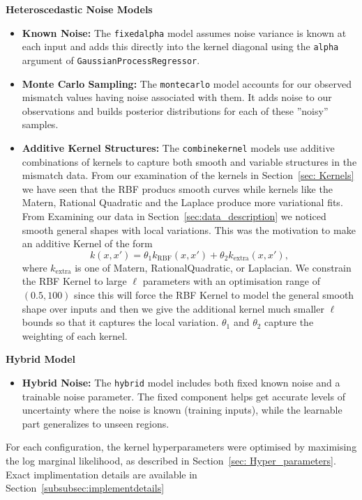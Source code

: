 \documentclass[10pt]{article}
\begin{document}
\noindent
\textbf{Heteroscedastic Noise Models}
\begin{itemize}
    \item \textbf{Known Noise:} The \texttt{fixedalpha} model assumes noise variance is known at each input and adds this directly into the kernel diagonal using the \texttt{alpha} argument of \texttt{GaussianProcessRegressor}.
    \item \textbf{Monte Carlo Sampling:} The \texttt{montecarlo} model accounts for our observed mismatch values having noise associated with them. It adds noise to our observations and builds posterior distributions for each of these ''noisy'' samples. 
    \item \textbf{Additive Kernel Structures:} The \texttt{combinekernel} models use additive combinations of kernels to capture both smooth and variable structures in the mismatch data. From our examination of the kernels in Section~\ref{sec: Kernels} we have seen that the RBF producs smooth curves while kernels like the Matern, Rational Quadratic and the Laplace produce more variational fits.
            From Examining our data in Section~\ref{sec:data_description} we noticed smooth general shapes with local variations. This was the motivation to make an additive Kernel of the form 
    \begin{equation}
        k(x, x') = \theta_1k_{\mathrm{RBF}}(x, x') + \theta_2k_{\mathrm{extra}}(x, x'),
    \end{equation}
    where \(k_{\mathrm{extra}}\) is one of Matern, RationalQuadratic, or Laplacian. We constrain the RBF Kernel to large \(\ell\) parameters with an optimisation range of \((0.5,100)\) since this will force the RBF Kernel to model the general smooth shape over inputs
    and then we give the additional kernel much smaller \(\ell\) bounds so that it captures the local variation. \(\theta_1\) and \(\theta_2\) capture the weighting of each kernel.
\end{itemize}
%
%

\noindent
\textbf{Hybrid Model}
\begin{itemize}
    \item \textbf{Hybrid Noise:} The \texttt{hybrid} model includes both fixed known noise and a trainable noise parameter. The fixed component helps get accurate levels of uncertainty where the noise is known (training inputs), while the learnable part generalizes to unseen regions.
\end{itemize}
%
For each configuration, the kernel hyperparameters were optimised by maximising the log marginal likelihood, as described in Section~\ref{sec: Hyper_parameters}. Exact implimentation details
are available in Section~\ref{subsubsec:implementdetails}
%
%
%
\end{document}
